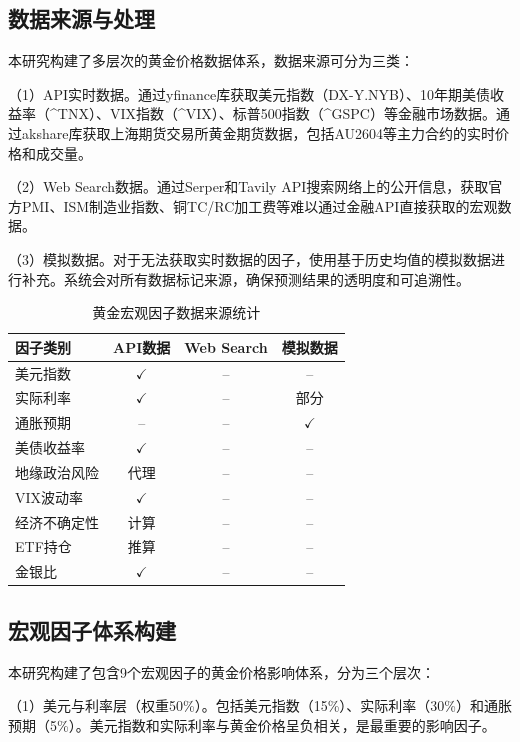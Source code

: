 \documentclass[UTF8,a4paper,12pt]{ctexart}
\begin{document}
\subsection{数据来源与处理}

本研究构建了多层次的黄金价格数据体系，数据来源可分为三类：

（1）API实时数据。通过yfinance库获取美元指数（DX-Y.NYB）、10年期美债收益率（\^{}TNX）、VIX指数（\^{}VIX）、标普500指数（\^{}GSPC）等金融市场数据。通过akshare库获取上海期货交易所黄金期货数据，包括AU2604等主力合约的实时价格和成交量。

（2）Web Search数据。通过Serper和Tavily API搜索网络上的公开信息，获取官方PMI、ISM制造业指数、铜TC/RC加工费等难以通过金融API直接获取的宏观数据。

（3）模拟数据。对于无法获取实时数据的因子，使用基于历史均值的模拟数据进行补充。系统会对所有数据标记来源，确保预测结果的透明度和可追溯性。

\begin{table}[htbp]
\centering
\caption{黄金宏观因子数据来源统计}
\label{tab:data-source}
\begin{tabular}{lccc}
\toprule
\textbf{因子类别} & \textbf{API数据} & \textbf{Web Search} & \textbf{模拟数据} \\
\midrule
美元指数 & $\checkmark$ & -- & -- \\
实际利率 & $\checkmark$ & -- & 部分 \\
通胀预期 & -- & -- & $\checkmark$ \\
美债收益率 & $\checkmark$ & -- & -- \\
地缘政治风险 & 代理 & -- & -- \\
VIX波动率 & $\checkmark$ & -- & -- \\
经济不确定性 & 计算 & -- & -- \\
ETF持仓 & 推算 & -- & -- \\
金银比 & $\checkmark$ & -- & -- \\
\bottomrule
\end{tabular}
\end{table}

\subsection{宏观因子体系构建}

本研究构建了包含9个宏观因子的黄金价格影响体系，分为三个层次：

（1）美元与利率层（权重50\%）。包括美元指数（15\%）、实际利率（30\%）和通胀预期（5\%）。美元指数和实际利率与黄金价格呈负相关，是最重要的影响因子。
\end{document}

